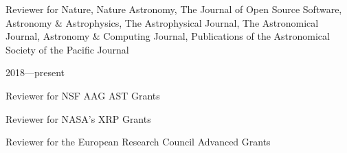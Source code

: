 \documentclass[12pt, a4paper]{article} %
\begin{document}
\vspace{0.2cm}

\begin{minipage}[t]{0.7\textwidth}
\begin{flushleft}%
  \setlength{\leftskip}{0.2cm}%
Reviewer for Nature, Nature Astronomy,  The Journal of Open Source Software, Astronomy \& Astrophysics, The Astrophysical Journal, The Astronomical Journal, Astronomy \& Computing Journal, Publications of the Astronomical Society of the Pacific Journal 
\end{flushleft}
\end{minipage}
\begin{minipage}[t]{0.3\textwidth}
\hfill 2018---present
\end{minipage}


\vspace{0.2cm}

\begin{minipage}[t]{0.7\textwidth}
\begin{flushleft}%
  \setlength{\leftskip}{0.2cm}%
Reviewer for NSF AAG AST Grants
\end{flushleft}
\end{minipage}
\begin{minipage}[t]{0.3\textwidth}
\end{minipage}

\vspace{0.2cm}


\begin{minipage}[t]{0.7\textwidth}
\begin{flushleft}%
  \setlength{\leftskip}{0.2cm}%
Reviewer for NASA's XRP Grants
\end{flushleft}
\end{minipage}
\begin{minipage}[t]{0.3\textwidth}
\end{minipage}

\vspace{0.2cm}

\begin{minipage}[t]{0.7\textwidth}
\begin{flushleft}%
  \setlength{\leftskip}{0.2cm}%
Reviewer for the European Research Council Advanced Grants
\end{flushleft}
\end{minipage}
\begin{minipage}[t]{0.3\textwidth}
\end{minipage}

\vspace{0.2cm}
\end{document}
